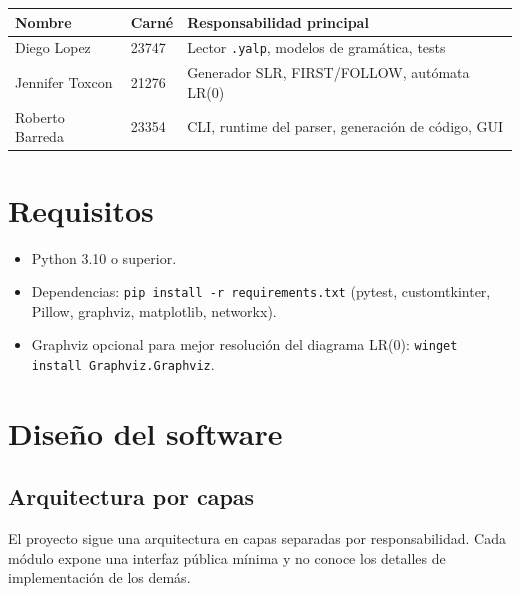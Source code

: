 \documentclass[11pt,a4paper]{article}
\begin{document}
\begin{tabular}{lll}
  \toprule
  \textbf{Nombre} & \textbf{Carné} & \textbf{Responsabilidad principal} \\
  \midrule
  Diego Lopez     & 23747 & Lector \texttt{.yalp}, modelos de gramática, tests \\
  Jennifer Toxcon & 21276 & Generador SLR, FIRST/FOLLOW, autómata LR(0) \\
  Roberto Barreda & 23354 & CLI, runtime del parser, generación de código, GUI \\
  \bottomrule
\end{tabular}

\section{Requisitos}

\begin{itemize}[noitemsep]
  \item Python 3.10 o superior.
  \item Dependencias: \lstinline|pip install -r requirements.txt|
        (pytest, customtkinter, Pillow, graphviz, matplotlib, networkx).
  \item Graphviz opcional para mejor resolución del diagrama LR(0):
        \lstinline|winget install Graphviz.Graphviz|.
\end{itemize}

\section{Diseño del software}

\subsection{Arquitectura por capas}

El proyecto sigue una arquitectura en capas separadas por responsabilidad.
Cada módulo expone una interfaz pública mínima y no conoce los detalles
de implementación de los demás.
\end{document}
